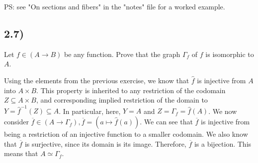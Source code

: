 \documentclass[12pt, letterpaper, twoside]{report}
\begin{document}


PS: see "On sections and fibers" in the "notes" file for a worked example.



\subsection*{2.7)}

Let $f \in (A \to B)$ be any function. Prove that the graph $\Gamma_f$ of $f$ is isomorphic to $A$.

Using the elements from the previous exercise, we know that $\hat{f}$ is injective from $A$ into $A \times B$. This property is inherited to any restriction of the codomain $Z \subseteq A \times B$, and corresponding implied restriction of the domain to $Y = \hat{f}^{-1}(Z) \subseteq A$. In particular, here, $Y = A$ and $Z = \Gamma_f = \hat{f}(A)$. We now consider $\overline{f} \in (A \to \Gamma_f), \overline{f} = (a \mapsto \hat{f}(a))$. We can see that $\overline{f}$ is injective from being a restriction of an injective function to a smaller codomain. We also know that $\overline{f}$ is surjective, since its domain is its image. Therefore, $\overline{f}$ is a bijection. This means that $A \simeq \Gamma_f$.
\end{document}

